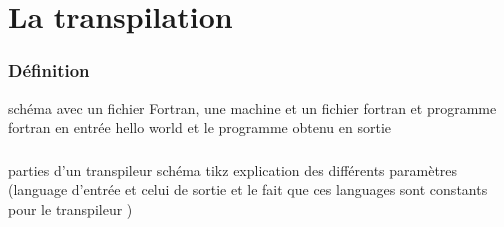 \section{La transpilation}

\begin{frame}
    \frametitle{Définition}
    schéma avec un fichier Fortran, une machine et un fichier fortran
    et 
    programme fortran en entrée hello world et le programme obtenu en sortie 
\end{frame}


\begin{frame}
    \frametitle{}
    parties d'un transpileur
    schéma tikz explication des différents paramètres (language d'entrée et celui de sortie et le fait que ces languages sont constants pour le transpileur ) 
\end{frame}

